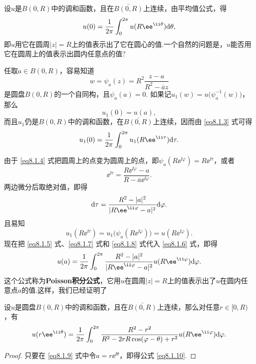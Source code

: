设$u$是$B(0,R)$中的调和函数，且在$\bar{B(0,R)}$上连续，由平均值公式，得
\begin{equation}\label{eq8.1.3}
u(0)=\frac1{2\pi}\int_0^{2\pi}u(R\ee^{\ii\theta})\textrm d\theta,
\end{equation}
即$u$用它在圆周$|z|=R$上的值表示出了它在圆心的值.一个自然的问题是，$u$能否用它在圆周上的值表示出圆内任意点的值?

任取$a\in B(0,R)$，容易知道
\begin{equation}\label{eq8.1.4}
w=\psi_a(z)=R^2\frac{z-a}{R^2-\bar az}
\end{equation}
是圆盘$B(0,R)$的一个自同构，且$\psi_a(a)=0$. 如果记$u_1(w)=u\big(\psi_a^{-1}(w)\big)$，那么
\begin{equation}\label{eq8.1.5}
u_1(0)=u(a),
\end{equation}
而且$u_1$仍是$B(0,R)$中的调和函数，在$\bar{B(0,R)}$上连续，因而由 \eqref{eq8.1.3} 式可得
\begin{equation}\label{eq8.1.6}
u_1(0)=\frac1{2\pi}\int_0^{2\pi}u_1(R\ee^{\ii\tau})\textrm d\tau.
\end{equation}

由于 \eqref{eq8.1.4} 式把圆周上的点变为圆周上的点，即$\psi_a(R\ee^{\ii\varphi})=R\ee^{\ii\tau}$，或者
\[\ee^{\ii\tau}=\frac{R\ee^{\ii\varphi}-a}{R-\bar a\ee^{\ii\varphi}}.\]
两边微分后取绝对值，即得
\begin{equation}\label{eq8.1.7}
\textrm d\tau=\frac{R^2-|a|^2}{|R\ee^{\ii\varphi}-a|^2}\textrm d\varphi.
\end{equation}
且易知
\begin{equation}\label{eq8.1.8}
u_1(R\ee^{\ii\tau})=u_1\big(\psi_a(R\ee^{\ii\varphi})\big)=u(R\ee^{\ii\varphi}).
\end{equation}
现在把 \eqref{eq8.1.5} 式、\eqref{eq8.1.7} 式和 \eqref{eq8.1.8} 式代入 \eqref{eq8.1.6} 式，即得
\begin{equation}\label{eq8.1.9}
u(a)=\frac1{2\pi}\int_0^{2\pi}\frac{R^2-|a|^2}{|R\ee^{\ii\varphi}-a|^2}
u(R\ee^{\ii\varphi})\textrm d\varphi.
\end{equation}
这个公式称为\textbf{Poisson积分公式}，它用$u$在圆周$|z|=R$上的值表示出了$u$在圆内任意点$a$的值.这样，我们已经证明了
\begin{theorem}\label{thm8.1.5}
设$u$是圆盘$B(0,R)$中的调和函数，且在$\bar{B(0,R)}$上连续，那么对任意$r\in[0,R)$，有
\begin{equation}\label{eq8.1.10}
u(r\ee^{\ii\theta})=\frac1{2\pi}\int_0^{2\pi}
\frac{R^2-r^2}{R^2-2rR\cos(\varphi-\theta)+r^2}u(R\ee^{\ii\varphi})\textrm d\varphi.
\end{equation}
\end{theorem}
\begin{proof}
只要在 \eqref{eq8.1.9} 式中令$a=r\ee^{\ii\theta}$，即得公式 \eqref{eq8.1.10}.
\end{proof}

